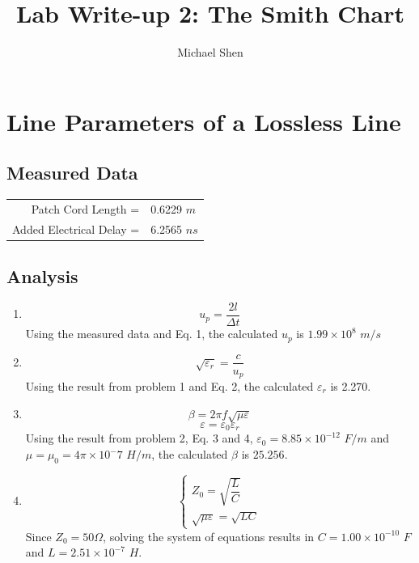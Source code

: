 \documentclass{article}
\begin{document}
\title{Lab Write-up 2: The Smith Chart}
\author{Michael Shen}
\maketitle


\section{Line Parameters of a Lossless Line}

\subsection{Measured Data}

\begin{table}[h]
\centering
	\begin{tabular}{rl}
	Patch Cord Length =  	  & 0.6229 $m$  \\
	Added Electrical Delay =  & 6.2565 $ns$      
	\end{tabular}
\end{table}

\subsection{Analysis}

\begin{enumerate}
	\item 
		\begin{equation}
			u_p = \dfrac{2l}{\Delta t}
		\end{equation}
		Using the measured data and Eq. 1, the calculated $u_p$ is $1.99\times 10^8$ $m/s$
	\item
		\begin{equation}
			\sqrt{\varepsilon_r} = \dfrac{c}{u_p}
		\end{equation}
		Using the result from problem 1 and Eq. 2, the calculated $\varepsilon_r$ is 2.270.
	\item
		\begin{equation}
			\beta = 2\pi f\sqrt{\mu\varepsilon}
		\end{equation}
		\begin{equation}
			\varepsilon = \varepsilon_0\varepsilon_r
		\end{equation}
		Using the result from problem 2, Eq. 3 and 4, $\varepsilon_0 = 8.85\times 10^{-12}$ $F/m$ and $\mu = \mu_0 = 4\pi\times 10^-7$ $H/m$, the calculated $\beta$ is $25.256$.
	\item
		\begin{equation}
			\begin{cases} 
				Z_0 = \sqrt{\dfrac{L}{C}} \\
				\sqrt{\mu\varepsilon} = \sqrt{LC}
			\end{cases}
		\end{equation}
		Since $Z_0 = 50 \Omega$, solving the system of equations results in $C = 1.00\times 10^{-10}$ $F$ and $L = 2.51\times 10^{-7}$ $H$.		
		
\end{enumerate}
\end{document}
